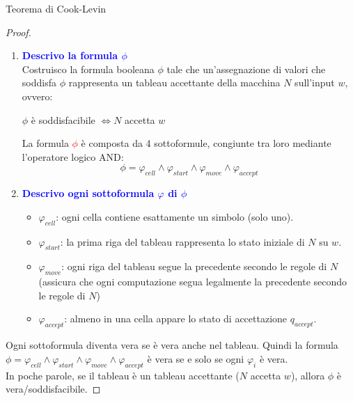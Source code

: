 \documentclass{article}  %
\theoremstyle{definition}
\begin{document}
\begin{theorem}{Teorema di Cook-Levin}
\begin{proof}
\begin{enumerate}
\[\begin{cases}
					      0 & \text{altrimenti}
				      \end{cases}
			      \]
			      Esempio nelle note\footnote{$x_{0,2,q_1}=1$ la variabile vale 1 perchè la cella della riga 0 e della colonna 2 contiene il simbolo $q_1$.}
			\item \textcolor{blue}{\textbf{Descrivo la formula $\phi$}} \\
			      Costruisco la formula booleana $\phi$ tale che un'assegnazione di valori che soddisfa $\phi$ rappresenta un tableau accettante della macchina $N$ sull'input $w$, ovvero:
			      \begin{center}
				      $\phi$ è soddisfacibile $\iff N$ accetta $w$
			      \end{center}
			      La formula \textcolor{red}{$\phi$} è composta da 4 sottoformule, congiunte tra loro mediante l'operatore logico AND:
			      \[
				      \phi = \varphi_{cell} \land \varphi_{start} \land \varphi_{move} \land \varphi_{accept}
			      \]
			\item \textcolor{blue}{\textbf{Descrivo ogni sottoformula $\varphi$ di $\phi$}}
			      \begin{itemize}
				      \item $\varphi_{cell}$:  ogni cella contiene esattamente un simbolo (solo uno).
				      \item $\varphi_{start}$: la prima riga del tableau rappresenta lo stato iniziale di $N$ su $w$.
				      \item $\varphi_{move}$:  ogni riga del tableau segue la precedente secondo le regole di $N$
				            (assicura che ogni computazione segua legalmente la precedente secondo le regole di $N$)
				      \item $\varphi_{accept}$: almeno in una cella appare lo stato di accettazione $q_{accept}$.
			      \end{itemize}
		\end{enumerate}
		Ogni sottoformula diventa vera se è vera anche nel tableau.
		Quindi la formula $\phi = \varphi_{cell} \land \varphi_{start} \land \varphi_{move} \land \varphi_{accept}$ è vera
		se e solo se ogni $\varphi_i$ è vera. \\
		In poche parole, se il tableau è un tableau accettante ($N$ accetta $w$), allora $\phi$ è vera/soddisfacibile.


\end{proof}
\end{theorem}
\end{document}
